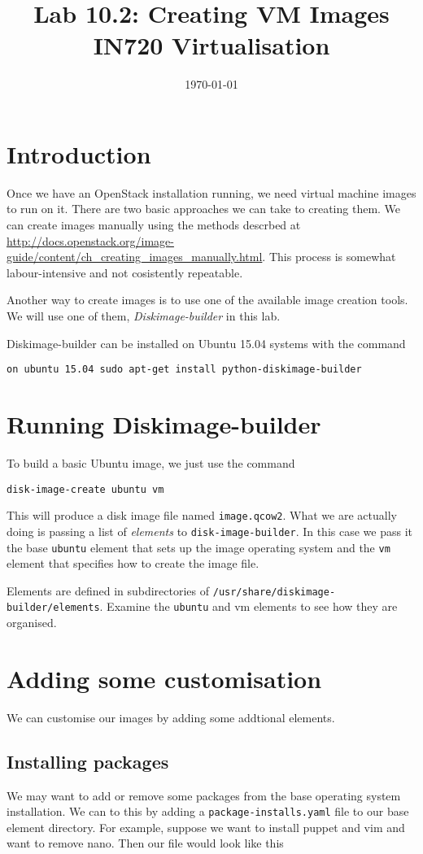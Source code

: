 \documentclass{article}
\begin{document}
\title{Lab 10.2: Creating VM Images \\ IN720 Virtualisation}
\date{\today}
\maketitle

\section*{Introduction}
Once we have an OpenStack installation running, we need virtual machine images to run on it. There are two basic approaches we can take to creating them.  We can create images manually using the methods descrbed at \url{http://docs.openstack.org/image-guide/content/ch_creating_images_manually.html}. This process is somewhat labour-intensive and not cosistently repeatable.

Another way to create images is to use one of the available image creation tools. We will use one of them, \emph{Diskimage-builder} in this lab.

Diskimage-builder can be installed on Ubuntu 15.04 systems with the command

\texttt{on ubuntu 15.04 sudo apt-get install python-diskimage-builder}

\section{Running Diskimage-builder}
To build a basic Ubuntu image, we just use the command

\texttt{disk-image-create ubuntu vm}

This will produce a disk image file named \texttt{image.qcow2}.  What we are actually doing is passing a list of \emph{elements} to \texttt{disk-image-builder}. In this case we pass it the base \texttt{ubuntu} element that sets up the image operating system and the \texttt{vm} element that specifies how to create the image file.

Elements are defined in subdirectories of \texttt{/usr/share/diskimage-builder/elements}.  Examine the \texttt{ubuntu} and {vm} elements to see how they are organised.

\section{Adding some customisation}
We can customise our images by adding some addtional elements.

\subsection{Installing packages}
We may want to add or remove some packages from the base operating system installation.  We can to this by adding a \texttt{package-installs.yaml} file to our base element directory.  For example, suppose we want to install puppet and vim and want to remove nano.  Then our file would look like this
\end{document}
